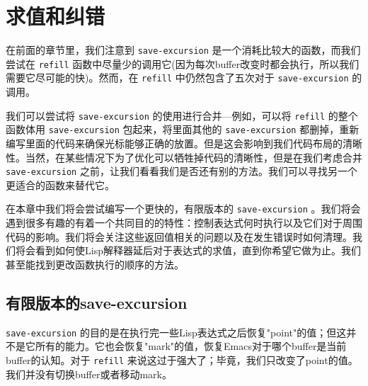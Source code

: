 \chapter{求值和纠错}
\label{chapter:08-Evaluation-and-Error-Recovery}


在前面的章节里，我们注意到 \texttt{save-excursion} 是一个消耗比较大的函数，而我们尝试在 \texttt{refill} 函数中尽量少的调用它(因为每次buffer改变时都会执行，所以我们需要它尽可能的快)。然而，在 \texttt{refill} 中仍然包含了五次对于 \texttt{save-excursion} 的调用。

我们可以尝试将 \texttt{save-excursion} 的使用进行合并---例如，可以将 \texttt{refill} 的整个函数体用 \texttt{save-excursion} 包起来，将里面其他的 \texttt{save-excursion} 都删掉，重新编写里面的代码来确保光标能够正确的放置。但是这会影响到我们代码布局的清晰性。当然，在某些情况下为了优化可以牺牲掉代码的清晰性，但是在我们考虑合并 \texttt{save-excursion} 之前，让我们看看我们是否还有别的方法。我们可以寻找另一个更适合的函数来替代它。

在本章中我们将会尝试编写一个更快的，有限版本的 \texttt{save-excursion} 。我们将会遇到很多有趣的有着一个共同目的的特性：控制表达式何时执行以及它们对于周围代码的影响。我们将会关注这些返回值相关的问题以及在发生错误时如何清理。我们将会看到如何使Lisp解释器延后对于表达式的求值，直到你希望它做为止。我们甚至能找到更改函数执行的顺序的方法。

\section{有限版本的save-excursion}
\label{section:08-limited-save-excursion}

 \texttt{save-excursion} 的目的是在执行完一些Lisp表达式之后恢复"point"的值；但这并不是它所有的能力。它也会恢复"mark"的值，恢复Emacs对于哪个buffer是当前buffer的认知。对于 \texttt{refill} 来说这过于强大了；毕竟，我们只改变了point的值。我们并没有切换buffer或者移动mark。


